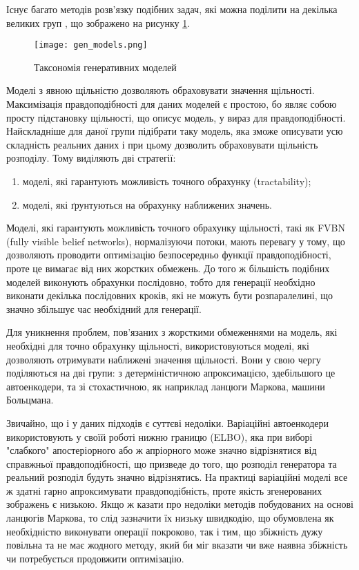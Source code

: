 Існує багато методів розв'язку подібних задач, які можна поділити
на декілька великих груп \cite{goodfellow2016nips},
що зображено на рисунку \ref{fig:gen_models}.

\begin{figure}[!ht]
    \centering
    \texttt{[image: gen\_models.png]}
    \caption{Таксономія генеративних моделей}
    \label{fig:gen_models}
\end{figure}

Моделі з явною щільністю дозволяють обраховувати значення щільності.
Максимізація правдоподібності для даних моделей є простою,
бо являє собою просту підстановку щільності, що описує модель,
у вираз для правдоподібності. Найскладніше для даної групи
підібрати таку модель, яка зможе описувати усю складність реальних даних
і при цьому дозволить обраховувати щільність розподілу.
Тому виділяють дві стратегії:
\begin{enumerate}
    \item моделі, які гарантують можливість точного обрахунку (tractability);
    \item моделі, які ґрунтуються на обрахунку наближених значень.
\end{enumerate}

Моделі, які гарантують можливість точного обрахунку щільності, такі як
FVBN (fully visible belief networks), нормалізуючи потоки, мають перевагу у тому,
що дозволяють проводити оптимізацію безпосередньо функції
правдоподібності, проте це вимагає від них жорстких обмежень.
До того ж більшість подібних моделей виконують обрахунки послідовно,
тобто для генерації необхідно виконати декілька послідовних кроків, які
не можуть бути розпаралелині, що значно збільшує час необхідний для
генерації.

Для уникнення проблем, пов'язаних з жорсткими обмеженнями на
модель, які необхідні для точно обрахунку щільності, використовуються
моделі, які дозволяють отримувати наближені значення щільності.
Вони у свою чергу поділяються на дві групи: з детерміністичною
апроксимацією, здебільшого це автоенкодери, та зі стохастичною,
як наприклад ланцюги Маркова, машини Больцмана.

Звичайно, що і у даних підходів є суттєві недоліки.
Варіаційні автоенкодери використовують у своїй роботі
нижню границю (ELBO), яка при виборі "слабкого" апостеріорного
або ж апріорного може значно відрізнятися від справжньої
правдоподібності, що призведе до того, що розподіл генератора
та реальний розподіл будуть значно відрізнятись. На практиці
варіаційні моделі все ж здатні гарно апроксимувати правдоподібність,
проте якість згенерованих зображень є низькою. Якщо ж казати про
недоліки методів побудованих на основі ланцюгів Маркова, то
слід зазначити їх низьку швидкодію, що обумовлена як необхідністю
виконувати операції покроково, так і тим, що збіжність
дужу повільна та не має жодного методу, який би міг вказати
чи вже наявна збіжність чи потребується продовжити оптимізацію.

